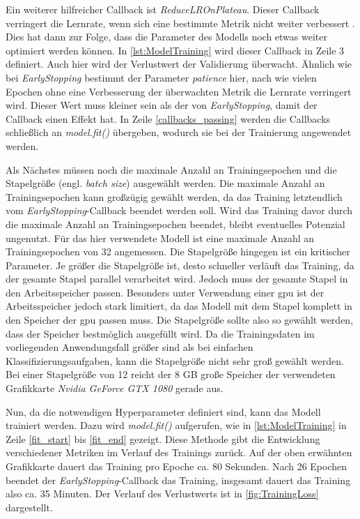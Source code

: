 Ein weiterer hilfreicher Callback ist \emph{ReduceLROnPlateau}.
Dieser Callback verringert die Lernrate, wenn sich eine bestimmte Metrik nicht weiter verbessert \cite{KerasReduceLROnPlateau}.
Dies hat dann zur Folge, dass die Parameter des Modells noch etwas weiter optimiert werden können.
In \autoref{lst:ModelTraining} wird dieser Callback in Zeile 3 definiert.
Auch hier wird der Verlustwert der Validierung überwacht.
Ähnlich wie bei \emph{EarlyStopping} bestimmt der Parameter \emph{patience} hier, nach wie vielen Epochen ohne eine Verbesserung der überwachten Metrik die Lernrate verringert wird.
Dieser Wert muss kleiner sein als der von \emph{EarlyStopping}, damit der Callback einen Effekt hat.
In Zeile \ref{callbacks_passing} werden die Callbacks schließlich an \emph{model.fit()} übergeben, wodurch sie bei der Trainierung angewendet werden.

Als Nächstes müssen noch die maximale Anzahl an Trainingsepochen und die Stapelgröße (engl. \emph{batch size}) ausgewählt werden.
Die maximale Anzahl an Trainingsepochen kann großzügig gewählt werden, da das Training letztendlich vom \emph{EarlyStopping}-Callback beendet werden soll.
Wird das Training davor durch die maximale Anzahl an Trainingsepochen beendet, bleibt eventuelles Potenzial ungenutzt.
Für das hier verwendete Modell ist eine maximale Anzahl an Trainingsepochen von 32 angemessen.
Die Stapelgröße hingegen ist ein kritischer Parameter.
Je größer die Stapelgröße ist, desto schneller verläuft das Training, da der gesamte Stapel parallel verarbeitet wird.
Jedoch muss der gesamte Stapel in den Arbeitsspeicher passen.
Besonders unter Verwendung einer \acrshort{gpu} ist der Arbeitsspeicher jedoch stark limitiert, da das Modell mit dem Stapel komplett in den Speicher der \acrshort{gpu} passen muss.
Die Stapelgröße sollte also so gewählt werden, dass der Speicher bestmöglich ausgefüllt wird.
Da die Trainingsdaten im vorliegenden Anwendungsfall größer sind als bei einfachen Klassifizierungsaufgaben, kann die Stapelgröße nicht sehr groß gewählt werden.
Bei einer Stapelgröße von 12 reicht der 8 GB große Speicher der verwendeten Grafikkarte \emph{Nvidia GeForce GTX 1080} gerade aus.

Nun, da die notwendigen Hyperparameter definiert sind, kann das Modell trainiert werden.
Dazu wird \emph{model.fit()} aufgerufen, wie in \autoref{lst:ModelTraining} in Zeile \ref{fit_start} bis \ref{fit_end} gezeigt.
Diese Methode gibt die Entwicklung verschiedener Metriken im Verlauf des Trainings zurück.
Auf der oben erwähnten Grafikkarte dauert das Training pro Epoche ca. 80 Sekunden.
Nach 26 Epochen beendet der \emph{EarlyStopping}-Callback das Training, insgesamt dauert das Training also ca. 35 Minuten.
Der Verlauf des Verlustwerts ist in \autoref{fig:TrainingLoss} dargestellt.

